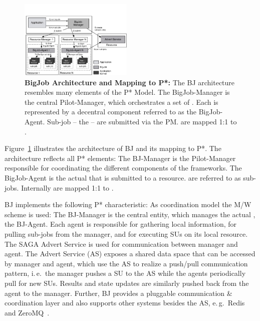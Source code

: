 \documentclass{sig-alternate}
\begin{document}

\begin{figure}[t]
	\up\upp
	\centering
	\includegraphics[width=0.48\textwidth]{figures/re_bigjob_interactions.pdf}
	\caption{\textbf{BigJob Architecture and Mapping to P*:} The
          BJ architecture resembles many elements of the P* Model. The
          BigJob-Manager is the central Pilot-Manager, which
          orchestrates a set of \pilots. Each \pilot is represented by a
          decentral component referred to as the BigJob-Agent. Sub-job
          -- the \cus -- are submitted via the PM. \cus are mapped 1:1
          to \sus. %
        }
	\label{fig:figures_re_bigjob_interactions}
\end{figure}


Figure~\ref{fig:figures_re_bigjob_interactions} illustrates the
architecture of BJ and its mapping to P*. The architecture reflects
all P* elements: The BJ-Manager is the Pilot-Manager responsible for
coordinating the different components of the frameworks. The
BigJob-Agent is the actual \pilot that is submitted to a
resource. \cus are referred to as sub-jobs. Internally \cus are mapped
1:1 to \sus.

BJ implements the following P* characteristic: As coordination model the 
M/W scheme is used: The BJ-Manager is the central entity, which manages the
actual \pilot, the BJ-Agent. Each agent is responsible for gathering local
information, for pulling sub-jobs from the manager, and for executing SUs on its
local resource. The SAGA Advert Service is used for communication between
manager and agent. The Advert Service (AS) exposes a shared data space that can
be accessed by manager and agent, which use the AS to realize a push/pull
communication pattern, i.\,e.\ the manager pushes a SU to the AS while the
agents periodically pull for new SUs. Results and state updates are similarly
pushed back from the agent to the manager. Further, BJ provides a pluggable
communication \& coordination layer and also supports other \cc systems besides 
the AS, e.\,g.\ Redis~\cite{redis} and ZeroMQ~\cite{zmq}.
\end{document}
